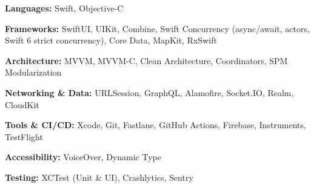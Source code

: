 {\small
\textbf{Languages:} Swift, Objective-C

\smallskip
\textbf{Frameworks:} SwiftUI, UIKit, Combine, Swift Concurrency (async/await, actors, Swift 6 strict concurrency), Core Data, MapKit, RxSwift

\smallskip
\textbf{Architecture:} MVVM, MVVM-C, Clean Architecture, Coordinators, SPM Modularization

\smallskip
\textbf{Networking \& Data:} URLSession, GraphQL, Alamofire, Socket.IO, Realm, CloudKit

\smallskip
\textbf{Tools \& CI/CD:} Xcode, Git, Fastlane, GitHub Actions, Firebase, Instruments, TestFlight

\smallskip
\textbf{Accessibility:} VoiceOver, Dynamic Type

\smallskip
\textbf{Testing:} XCTest (Unit \& UI), Crashlytics, Sentry
\par}
